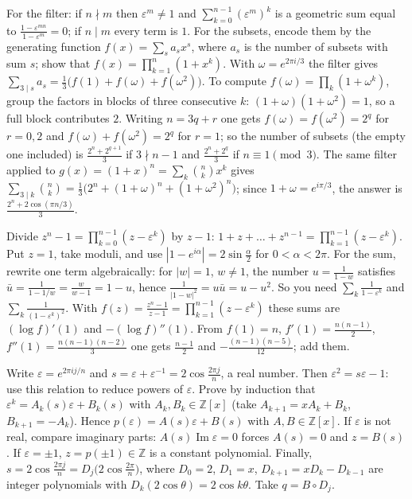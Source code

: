 \documentclass[11pt,a4paper]{article}
\begin{document}

 For the filter: if $n\nmid m$ then $\varepsilon^m\ne1$ and $\sum_{k=0}^{n-1}(\varepsilon^m)^k$ is a geometric sum equal to $\frac{1-\varepsilon^{mn}}{1-\varepsilon^m}=0$; if $n\mid m$ every term is $1$. For the subsets, encode them by the generating function $f(x)=\sum_s a_sx^s$, where $a_s$ is the number of subsets with sum $s$; show that $f(x)=\prod_{k=1}^n(1+x^k)$.
 With $\omega=e^{2\pi i/3}$ the filter gives $\sum_{3\mid s}a_s=\frac13\bigl(f(1)+f(\omega)+f(\omega^2)\bigr)$. To compute $f(\omega)=\prod_k(1+\omega^k)$, group the factors in blocks of three consecutive $k$: $(1+\omega)(1+\omega^2)=1$, so a full block contributes $2$.
 Writing $n=3q+r$ one gets $f(\omega)=f(\omega^2)=2^q$ for $r=0,2$ and $f(\omega)+f(\omega^2)=2^q$ for $r=1$; so the number of subsets (the empty one included) is $\frac{2^n+2^{q+1}}3$ if $3\nmid n-1$ and $\frac{2^n+2^q}3$ if $n\equiv1\pmod 3$.
 The same filter applied to $g(x)=(1+x)^n=\sum_k\binom nkx^k$ gives $\sum_{3\mid k}\binom nk=\frac13\bigl(2^n+(1+\omega)^n+(1+\omega^2)^n\bigr)$; since $1+\omega=e^{i\pi/3}$, the answer is $\frac{2^n+2\cos(\pi n/3)}{3}$.

 Divide $z^n-1=\prod_{k=0}^{n-1}(z-\varepsilon^k)$ by $z-1$: $1+z+\dots+z^{n-1}=\prod_{k=1}^{n-1}(z-\varepsilon^k)$. Put $z=1$, take moduli, and use $|1-e^{i\alpha}|=2\sin\frac\alpha2$ for $0<\alpha<2\pi$.
 For the sum, rewrite one term algebraically: for $|w|=1$, $w\ne1$, the number $u=\frac1{1-w}$ satisfies $\bar u=\frac1{1-1/w}=\frac{w}{w-1}=1-u$, hence $\frac{1}{|1-w|^2}=u\bar u=u-u^2$. So you need $\sum_k\frac1{1-\varepsilon^k}$ and $\sum_k\frac1{(1-\varepsilon^k)^2}$.
 With $f(z)=\frac{z^n-1}{z-1}=\prod_{k=1}^{n-1}(z-\varepsilon^k)$ these sums are $(\log f)'(1)$ and $-(\log f)''(1)$. From $f(1)=n$, $f'(1)=\frac{n(n-1)}2$, $f''(1)=\frac{n(n-1)(n-2)}3$ one gets $\frac{n-1}2$ and $-\frac{(n-1)(n-5)}{12}$; add them.

 Write $\varepsilon=e^{2\pi ij/n}$ and $s=\varepsilon+\varepsilon^{-1}=2\cos\frac{2\pi j}n$, a real number. Then $\varepsilon^2=s\varepsilon-1$: use this relation to reduce powers of $\varepsilon$.
 Prove by induction that $\varepsilon^k=A_k(s)\varepsilon+B_k(s)$ with $A_k,B_k\in\mathbb Z[x]$ (take $A_{k+1}=xA_k+B_k$, $B_{k+1}=-A_k$). Hence $p(\varepsilon)=A(s)\varepsilon+B(s)$ with $A,B\in\mathbb Z[x]$.
 If $\varepsilon$ is not real, compare imaginary parts: $A(s)\operatorname{Im}\varepsilon=0$ forces $A(s)=0$ and $z=B(s)$. If $\varepsilon=\pm1$, $z=p(\pm1)\in\mathbb Z$ is a constant polynomial.
 Finally, $s=2\cos\frac{2\pi j}{n}=D_j\bigl(2\cos\frac{2\pi}n\bigr)$, where $D_0=2$, $D_1=x$, $D_{k+1}=xD_k-D_{k-1}$ are integer polynomials with $D_k(2\cos\theta)=2\cos k\theta$. Take $q=B\circ D_j$.
\end{document}
